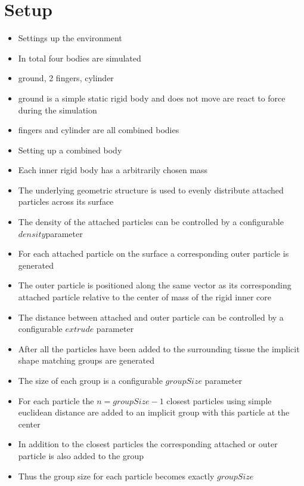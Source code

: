 \section{Setup}
\begin{itemize}
\item Settings up the environment
\item In total four bodies are simulated
\item ground, 2 fingers, cylinder
\item ground is a simple static rigid body and does not move are react to force during the simulation
\item fingers and cylinder are all combined bodies
\item Setting up a combined body
\item Each inner rigid body has a arbitrarily chosen mass
\item The underlying geometric structure is used to evenly distribute attached particles across its surface
\item The density of the attached particles can be controlled by a configurable $density$parameter
\item For each attached particle on the surface a corresponding outer particle is generated
\item The outer particle is positioned along the same vector as its corresponding attached particle relative to the center of mass of the rigid inner core
\item The distance between attached and outer particle can be controlled by a configurable $extrude$ parameter
\item After all the particles have been added to the surrounding tissue the implicit shape matching groups are generated
\item The size of each group is a configurable $groupSize$ parameter
\item For each particle the $n = groupSize - 1$ closest particles using simple euclidean distance are added to an implicit group with this particle at the center
\item In addition to the closest particles the corresponding attached or outer particle is also added to the group
\item Thus the group size for each particle becomes exactly $groupSize$
\end{itemize}
